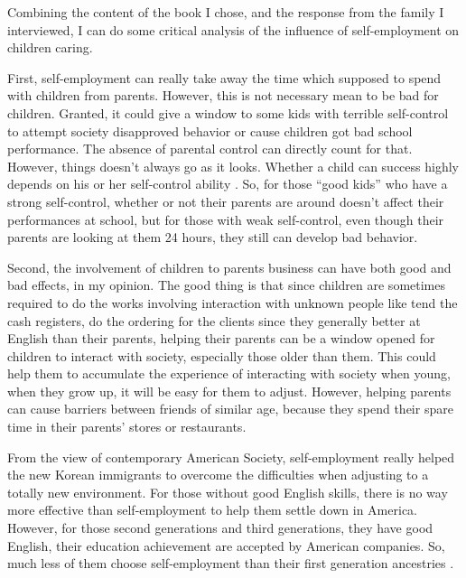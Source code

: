 Combining the content of the book I chose, and the response from the family
I interviewed, I can do some critical analysis of the influence of
self-employment on children caring.
\par
First, self-employment can really take away the time which supposed to spend
with children from parents. However, this is not necessary mean to be bad for
children. Granted, it could give a window to some kids with terrible
self-control to attempt society disapproved behavior or cause children got bad
school performance. The absence of parental control can directly count for that.
However, things doesn't always go as it looks. Whether a child can success
highly depends on his or her self-control ability \cite{article:SelfControl}.
So, for those ``good kids'' who have a strong self-control, whether or not their
parents are around doesn't affect their performances at school, but for those
with weak self-control, even though their parents are looking at them 24 hours,
they still can develop bad behavior.
\par
Second, the involvement of children to parents business can have both good and
bad effects, in my opinion. The good thing is that since children are sometimes
required to do the works involving interaction with unknown people like tend the
cash registers, do the ordering for the clients since they generally better at
English than their parents, helping their parents can be a window opened for
children to interact with society, especially those older than them. This could 
help them to accumulate the experience of interacting with society when young, 
when they grow up, it will be easy for them to adjust. However, helping parents 
can cause barriers between friends of similar age, because they spend their
spare  time in their parents' stores or restaurants.
\par
From the view of contemporary American Society, self-employment really helped
the new Korean immigrants to overcome the difficulties when adjusting to a
totally new environment. For those without good English skills, there is no way
more effective than self-employment to help them settle down in America.
However, for those second generations and third generations, they have good
English, their education achievement are accepted by American companies. So,
much less of them choose self-employment than their first generation ancestries
\cite{online:SecondGenerationSelfEmployment}.
